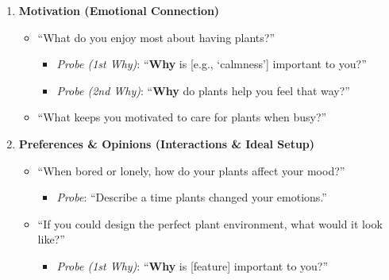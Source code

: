 \documentclass[math,code]{amznotes}
\theoremstyle{remark}
\begin{document}
\begin{enumerate}
    \item \textbf{Motivation (Emotional Connection)}
    \begin{itemize}
        \item ``What do you enjoy most about having plants?''
        \begin{itemize}
            \item \textit{Probe (1st Why)}: ``\textbf{Why} is [e.g., ‘calmness’] important to you?''
            \item \textit{Probe (2nd Why)}: ``\textbf{Why} do plants help you feel that way?''
        \end{itemize}
        \item ``What keeps you motivated to care for plants when busy?''
    \end{itemize}
    
    \item \textbf{Preferences \& Opinions (Interactions \& Ideal Setup)}
    \begin{itemize}
        \item ``When bored or lonely, how do your plants affect your mood?''
        \begin{itemize}
            \item \textit{Probe}: ``Describe a time plants changed your emotions.''
        \end{itemize}
        \item ``If you could design the perfect plant environment, what would it look like?''
        \begin{itemize}
            \item \textit{Probe (1st Why)}: ``\textbf{Why} is [feature] important to you?''
        \end{itemize}
    \end{itemize}
    

\end{enumerate}
\end{document}
